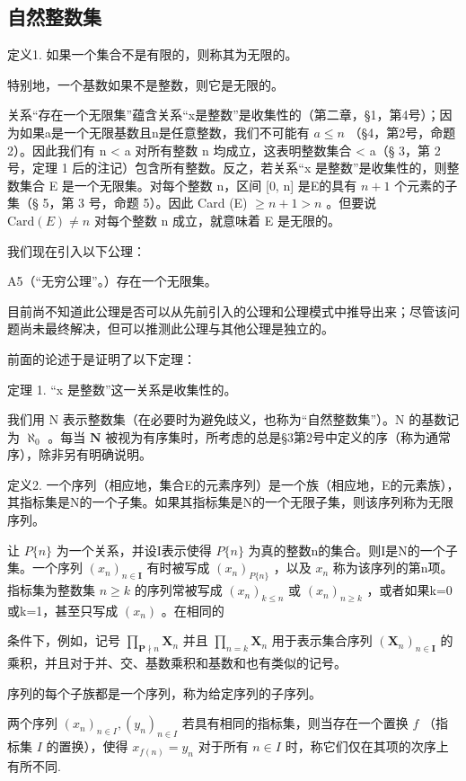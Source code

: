 \subsection{自然整数集}

定义1. 如果一个集合不是有限的，则称其为无限的。

特别地，一个基数如果不是整数，则它是无限的。

关系“存在一个无限集”蕴含关系“x是整数”是收集性的（第二章，§1，第4号）；因为如果a是一个无限基数且n是任意整数，我们不可能有 \(a \leqslant n\) （§4，第2号，命题2）。因此我们有 n \textless{} a 对所有整数 n 均成立，这表明整数集合 \textless{} a（§ 3，第 2 号，定理 1 后的注记）包含所有整数。反之，若关系“x 是整数”是收集性的，则整数集合 E 是一个无限集。对每个整数 n，区间 {[}0, n{]} 是E的具有 \(n + 1\) 个元素的子集（§ 5，第 3 号，命题 5）。因此 Card (E) \(\geqslant n + 1 > n\) 。但要说 \(\text{Card}(E) \neq n\) 对每个整数 n 成立，就意味着 E 是无限的。

我们现在引入以下公理：

A5（“无穷公理”。）存在一个无限集。

目前尚不知道此公理是否可以从先前引入的公理和公理模式中推导出来；尽管该问题尚未最终解决，但可以推测此公理与其他公理是独立的。

前面的论述于是证明了以下定理：

定理 1. “x 是整数”这一关系是收集性的。

我们用 N 表示整数集（在必要时为避免歧义，也称为“自然整数集”）。N 的基数记为 \(\aleph_0\) 。每当 \(\mathbf{N}\) 被视为有序集时，所考虑的总是§3第2号中定义的序（称为通常序），除非另有明确说明。

定义2. 一个序列（相应地，集合E的元素序列）是一个族（相应地，E的元素族），其指标集是N的一个子集。如果其指标集是N的一个无限子集，则该序列称为无限序列。

让 \(P\{n\}\) 为一个关系，并设I表示使得 \(P\{n\}\) 为真的整数n的集合。则I是N的一个子集。一个序列 \((x_n)_{n \in \mathbf{I}}\) 有时被写成 \((x_n)_{P\{n\}}\) ，以及 \(x_n\) 称为该序列的第n项。指标集为整数集 \(n \geqslant k\) 的序列常被写成 \((x_n)_{k \leqslant n}\) 或 \((x_n)_{n \geqslant k}\) ，或者如果k=0或k=1，甚至只写成 \((x_n)\) 。在相同的

条件下，例如，记号 \(\prod_{\mathbf{P}\nmid n}\mathbf{X}_n\) 并且 \(\prod_{n = k}\mathbf{X}_n\) 用于表示集合序列 \((\mathbf{X}_n)_{n\in \mathbf{I}}\) 的乘积，并且对于并、交、基数乘积和基数和也有类似的记号。

序列的每个子族都是一个序列，称为给定序列的子序列。

两个序列 \((x_{n})_{n\in I}, (y_{n})_{n\in I}\) 若具有相同的指标集，则当存在一个置换 \(f\) （指标集 \(I\) 的置换），使得 \(x_{f(n)} = y_{n}\) 对于所有 \(n\in I\) 时，称它们仅在其项的次序上有所不同.

